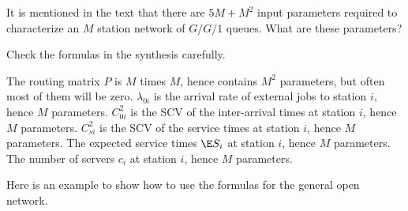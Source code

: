\begin{exercise}
  It is mentioned in the text that there are $5M+M^2$ input parameters
  required to characterize an $M$ station network of $G/G/1$ queues. What are these parameters?
  \begin{hint}
 Check the formulas in the synthesis carefully.
  \end{hint}
  \begin{solution}
 The routing matrix $P$ is $M$ times $M$, hence contains
      $M^2$ parameters, but often most of them will be zero.
 $\lambda_{0i}$ is the arrival rate of external jobs to station $i$, hence $M$ parameters.
 $C_{0i}^2$ is the SCV of the inter-arrival times at station
      $i$, hence $M$ parameters.
 $C_{si}^2$ is the SCV of the service times at station $i$,
      hence $M$ parameters.
 The expected service times $\E S_i$ at station $i$, 
      hence $M$ parameters.
 The number of servers $c_i$ at station $i$, hence $M$
      parameters.
  \end{solution}
\end{exercise}


Here is an example to show how to use the formulas for the general open network.

